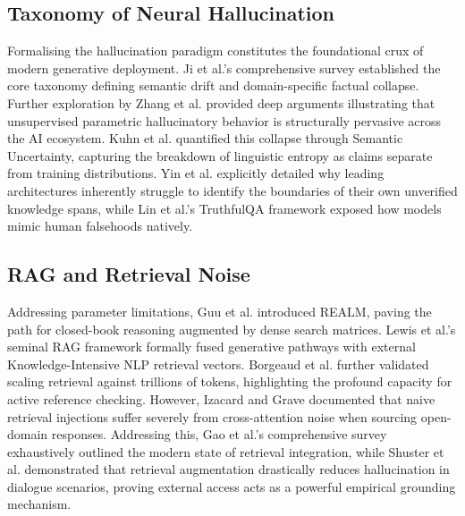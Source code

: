\documentclass[10pt,journal,compsoc]{IEEEtran}
\begin{document}
\subsection{Taxonomy of Neural Hallucination}
Formalising the hallucination paradigm constitutes the foundational crux of modern generative deployment. Ji et al.'s comprehensive survey \cite{ref1} established the core taxonomy defining semantic drift and domain-specific factual collapse. Further exploration by Zhang et al. \cite{ref16} provided deep arguments illustrating that unsupervised parametric hallucinatory behavior is structurally pervasive across the AI ecosystem. Kuhn et al. \cite{ref2} quantified this collapse through Semantic Uncertainty, capturing the breakdown of linguistic entropy as claims separate from training distributions. Yin et al. \cite{ref23} explicitly detailed why leading architectures inherently struggle to identify the boundaries of their own unverified knowledge spans, while Lin et al.'s TruthfulQA framework \cite{ref12} exposed how models mimic human falsehoods natively.

\subsection{RAG and Retrieval Noise}
Addressing parameter limitations, Guu et al. \cite{ref4} introduced REALM, paving the path for closed-book reasoning augmented by dense search matrices. Lewis et al.'s seminal RAG framework \cite{ref3} formally fused generative pathways with external Knowledge-Intensive NLP retrieval vectors. Borgeaud et al. \cite{ref5} further validated scaling retrieval against trillions of tokens, highlighting the profound capacity for active reference checking. However, Izacard and Grave \cite{ref6} documented that naive retrieval injections suffer severely from cross-attention noise when sourcing open-domain responses. Addressing this, Gao et al.'s comprehensive survey \cite{ref7} exhaustively outlined the modern state of retrieval integration, while Shuster et al. \cite{ref8} demonstrated that retrieval augmentation drastically reduces hallucination in dialogue scenarios, proving external access acts as a powerful empirical grounding mechanism.
\end{document}
